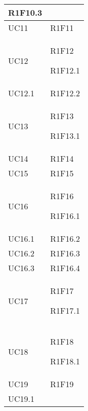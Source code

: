 \begin{center}
\begin{longtable}{|p{44mm}|p{22mm}|}
R1F10.3 \newline
\\
\hline
UC11 &

R1F11 \newline
\\
\hline
UC12 &

R1F12 \newline

R1F12.1 \newline
\\
\hline
UC12.1 &

R1F12.2 \newline
\\
\hline
UC13 &

R1F13 \newline

R1F13.1 \newline
\\
\hline
UC14 &

R1F14 \newline
\\
\hline
UC15 &

R1F15 \newline
\\
\hline
UC16 &

R1F16 \newline

R1F16.1 \newline
\\
\hline
UC16.1 &

R1F16.2 \newline
\\
\hline
UC16.2 &

R1F16.3 \newline
\\
\hline
UC16.3 &

R1F16.4 \newline
\\
\hline
UC17 &

R1F17 \newline

R1F17.1 \newline
\\
\hline
UC18 &

R1F18 \newline

R1F18.1 \newline
\\
\hline
UC19 &

R1F19 \newline
\\
\hline
UC19.1 &


\end{longtable}
\end{center}
